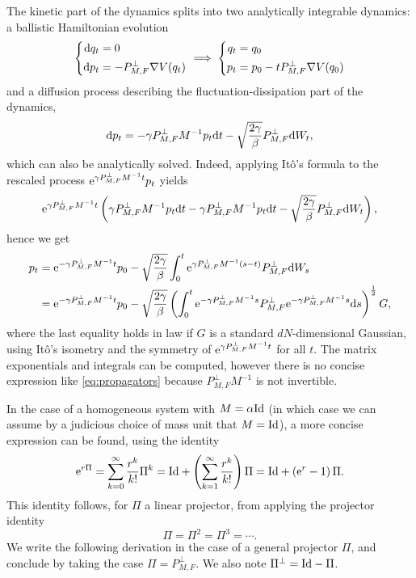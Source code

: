 The kinetic part of the dynamics splits into two analytically integrable dynamics: a ballistic Hamiltonian evolution
\begin{equation}
    \label{eq:elem_hamiltonian_equation}
    \left\{\begin{aligned}
        \mathrm{d} q_t&=0\\
        \mathrm{d} p_t&=-P_{M,F}^\perp\nabla V(q_t)
    \end{aligned}\right.\implies\left\{\begin{aligned}
        q_t&=q_0\\
        p_t&=p_0-tP_{M,F}^\perp\nabla V(q_0)
    \end{aligned}\right.
\end{equation}
and a diffusion process describing the fluctuation-dissipation part of the dynamics,
\begin{equation}
    \label{eq:norton_ou_part}
    \mathrm{d} p_t=-\gamma P_{M,F}^\perp M^{-1}p_t\mathrm{d} t-\sqrt{\frac{2\gamma}{\beta}}P_{M,F}^\perp\mathrm{d} W_t,
\end{equation}
which can also be analytically solved.
Indeed, applying Itô's formula to the rescaled process $\mathrm{e}^{\gamma P_{M,F}^\perp M^{-1}t}p_t$ yields
\[\mathrm{e}^{\gamma P_{M,F}^\perp M^{-1}t}\left(\gamma P_{M,F}^\perp M^{-1}p_t\mathrm{d} t - \gamma P_{M,F}^\perp M^{-1}p_t\mathrm{d} t-\sqrt{\frac{2\gamma}{\beta}} P_{M,F}^\perp\mathrm{d} W_t\right),\]
hence we get 
\begin{equation}
    \label{eq:projected_ou_analytical_form}
    \begin{aligned}
    p_t&=\mathrm{e}^{-\gamma P_{M,F}^\perp M^{-1}t}p_0-\sqrt{\frac{2\gamma}{\beta}}\int_0^t\mathrm{e}^{\gamma P_{M,F}^\perp M^{-1}(s-t)} P_{M,F}^\perp\mathrm{d} W_s\\
    &=\mathrm{e}^{-\gamma P_{M,F}^\perp M^{-1}t}p_0-\sqrt{\frac{2\gamma}{\beta}}\left(\int_0^t\mathrm{e}^{-\gamma P_{M,F}^\perp M^{-1}s}P_{M,F}^\perp\mathrm{e}^{-\gamma P_{M,F}^\perp M^{-1}s} \mathrm{d} s\right)^{\frac12}G,
    \end{aligned}
\end{equation}
where the last equality holds in law if $G$ is a standard $dN$-dimensional Gaussian, using Itô's isometry and the symmetry of $\mathrm{e}^{\gamma P_{M,F}^\perp M^{-1}t}$ for all $t$.
The matrix exponentials and integrals can be computed, however there is no concise expression like \eqref{eq:propagators} because $P_{M,F}^\perp M^{-1}$ is not invertible.

In the case of a homogeneous system with $M=\alpha\mathrm{Id}$ (in which case we can assume by a judicious choice of mass unit that $M=\mathrm{Id}$), a more concise expression can be found, using the identity
\begin{equation}
     \label{eq:rodrigues_formula}\mathrm{e}^{r\Pi}=\sum_{k=0}^\infty \frac{r^k}{k!}\Pi^k=\mathrm{Id}+\left(\sum_{k=1}^\infty\frac{r^k}{k!}\right)\Pi=\mathrm{Id}+\left(\mathrm{e}^r-1\right)\Pi.
\end{equation}
This identity follows, for $\Pi$ a linear projector, from applying the projector identity \[\Pi=\Pi^2=\Pi^3=\dotsm.\]
We write the following derivation in the case of a general projector $\Pi$, and conclude by taking the case $\Pi=P_{M,F}^\perp$. We also note $\Pi^\perp=\mathrm{Id}-\Pi$.

